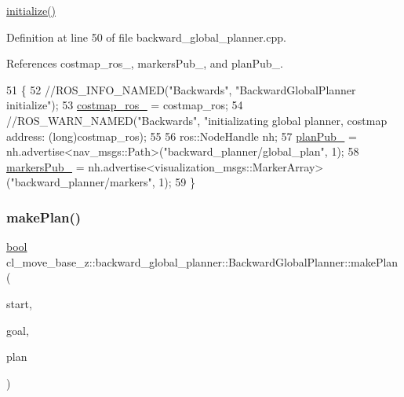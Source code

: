 \hyperlink{classcl__move__base__z_1_1backward__global__planner_1_1BackwardGlobalPlanner_af17978c77ec96d4ecc26b3a6ba75e1e9}{initialize()} 

Definition at line 50 of file backward\+\_\+global\+\_\+planner.\+cpp.



References costmap\+\_\+ros\+\_\+, markers\+Pub\+\_\+, and plan\+Pub\+\_\+.


\begin{DoxyCode}
51 \{
52     \textcolor{comment}{//ROS\_INFO\_NAMED("Backwards", "BackwardGlobalPlanner initialize");}
53     \hyperlink{classcl__move__base__z_1_1backward__global__planner_1_1BackwardGlobalPlanner_a7103c15e6540a514acd421c3c6e194a4}{costmap\_ros\_} = costmap\_ros;
54     \textcolor{comment}{//ROS\_WARN\_NAMED("Backwards", "initializating global planner, costmap address: %
       (long)costmap\_ros);}
55 
56     ros::NodeHandle nh;
57     \hyperlink{classcl__move__base__z_1_1backward__global__planner_1_1BackwardGlobalPlanner_a561eab039140948c52ec928c191f3f43}{planPub\_} = nh.advertise<nav\_msgs::Path>(\textcolor{stringliteral}{"backward\_planner/global\_plan"}, 1);
58     \hyperlink{classcl__move__base__z_1_1backward__global__planner_1_1BackwardGlobalPlanner_a6f80f7041c8cdc93e1f3dfd0e723654a}{markersPub\_} = nh.advertise<visualization\_msgs::MarkerArray>(\textcolor{stringliteral}{"backward\_planner/markers"}, 1);
59 \}
\end{DoxyCode}
\mbox{\label{classcl__move__base__z_1_1backward__global__planner_1_1BackwardGlobalPlanner_a3f1f3c81e7c52c9305544fd793741a41}} 
\subsubsection{\texorpdfstring{make\+Plan()}{makePlan()}\hspace{0.1cm}{\footnotesize\ttfamily [1/2]}}
{\footnotesize\ttfamily \hyperlink{classbool}{bool} cl\+\_\+move\+\_\+base\+\_\+z\+::backward\+\_\+global\+\_\+planner\+::\+Backward\+Global\+Planner\+::make\+Plan (\begin{DoxyParamCaption}\item[{const geometry\+\_\+msgs\+::\+Pose\+Stamped \&}]{start,  }\item[{const geometry\+\_\+msgs\+::\+Pose\+Stamped \&}]{goal,  }\item[{std\+::vector$<$ geometry\+\_\+msgs\+::\+Pose\+Stamped $>$ \&}]{plan }\end{DoxyParamCaption})}


